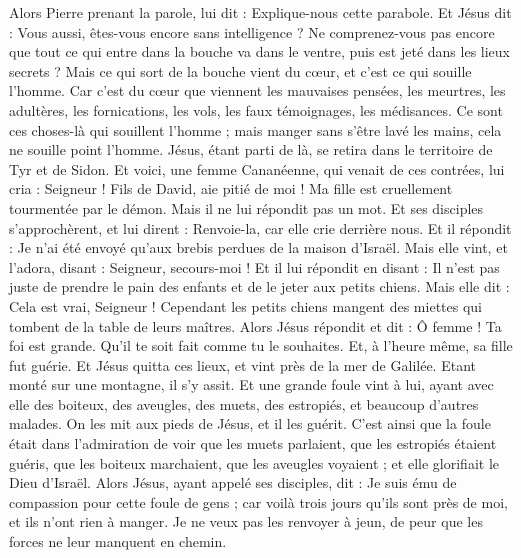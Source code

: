 \begin{multicols}{2}
Alors Pierre prenant la parole, lui dit : Explique-nous cette parabole.
Et Jésus dit : Vous aussi, êtes-vous encore sans intelligence ?
Ne comprenez-vous pas encore que tout ce qui entre dans la bouche va dans le ventre, puis est jeté dans les lieux secrets ?
Mais ce qui sort de la bouche vient du cœur, et c’est ce qui souille l'homme.
Car c’est du cœur que viennent les mauvaises pensées, les meurtres, les adultères, les fornications, les vols, les faux témoignages, les médisances.
Ce sont ces choses-là qui souillent l'homme ; mais manger sans s’être lavé les mains, cela ne souille point l'homme.
Jésus, étant parti de là, se retira dans le territoire de Tyr et de Sidon.
Et voici, une femme Cananéenne, qui venait de ces contrées, lui cria : Seigneur ! Fils de David, aie pitié de moi ! Ma fille est cruellement tourmentée par le démon.
Mais il ne lui répondit pas un mot. Et ses disciples s'approchèrent, et lui dirent : Renvoie-la, car elle crie derrière nous.
Et il répondit : Je n’ai été envoyé qu'aux brebis perdues de la maison d'Israël.
Mais elle vint, et l'adora, disant : Seigneur, secours-moi !
Et il lui répondit en disant : Il n’est pas juste de prendre le pain des enfants et de le jeter aux petits chiens.
Mais elle dit : Cela est vrai, Seigneur ! Cependant les petits chiens mangent des miettes qui tombent de la table de leurs maîtres.
Alors Jésus répondit et dit : Ô femme ! Ta foi est grande. Qu'il te soit fait comme tu le souhaites. Et, à l’heure même, sa fille fut guérie.
Et Jésus quitta ces lieux, et vint près de la mer de Galilée. Etant monté sur une montagne, il s’y assit.
Et une grande foule vint à lui, ayant avec elle des boiteux, des aveugles, des muets, des estropiés, et beaucoup d’autres malades. On les mit aux pieds de Jésus, et il les guérit.
C’est ainsi que la foule était dans l’admiration de voir que les muets parlaient, que les estropiés étaient guéris, que les boiteux marchaient, que les aveugles voyaient ; et elle glorifiait le Dieu d'Israël.
Alors Jésus, ayant appelé ses disciples, dit : Je suis ému de compassion pour cette foule de gens ; car voilà trois jours qu'ils sont près de moi, et ils n'ont rien à manger. Je ne veux pas les renvoyer à jeun, de peur que les forces ne leur manquent en chemin.

\end{multicols}
